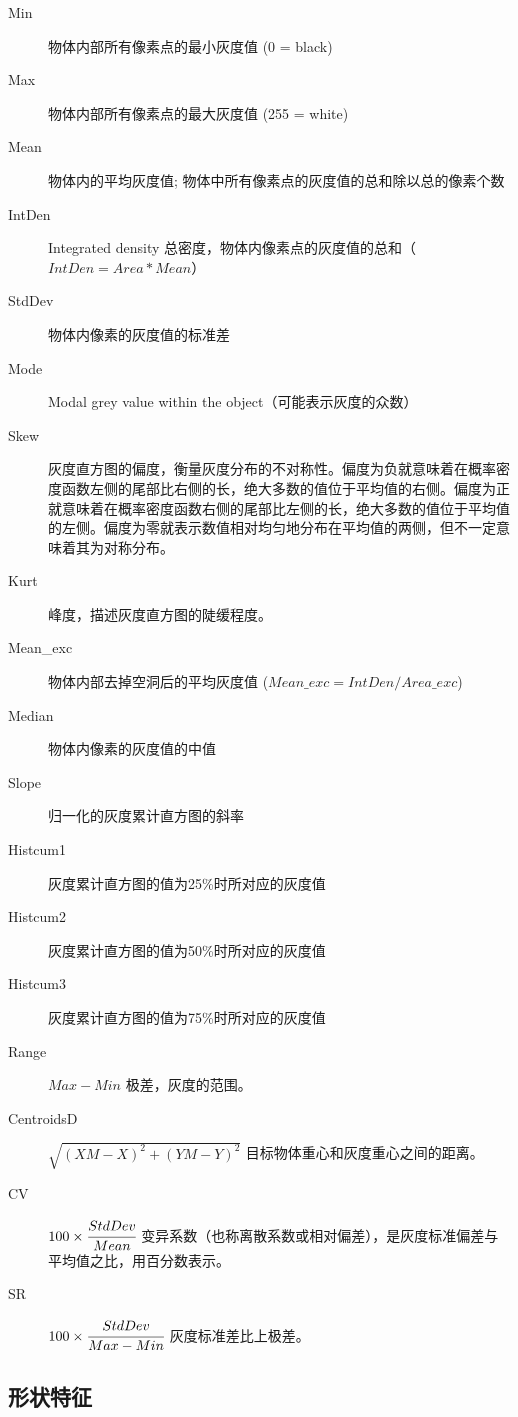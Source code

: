 \begin{description}
    \item[Min] 物体内部所有像素点的最小灰度值 (0 = black)
    \item[Max] 物体内部所有像素点的最大灰度值 (255 = white)
    \item[Mean] 物体内的平均灰度值; 物体中所有像素点的灰度值的总和除以总的像素个数
    \item[IntDen] Integrated density 总密度，物体内像素点的灰度值的总和（$IntDen = Area * Mean$）
    \item[StdDev] 物体内像素的灰度值的标准差
    \item[Mode] Modal grey value within the object（可能表示灰度的众数）
    \item[Skew] 灰度直方图的偏度，衡量灰度分布的不对称性。偏度为负就意味着在概率密度函数左侧的尾部比右侧的长，绝大多数的值位于平均值的右侧。偏度为正就意味着在概率密度函数右侧的尾部比左侧的长，绝大多数的值位于平均值的左侧。偏度为零就表示数值相对均匀地分布在平均值的两侧，但不一定意味着其为对称分布。
    \item[Kurt] 峰度，描述灰度直方图的陡缓程度。 
    \item[Mean\_exc] 物体内部去掉空洞后的平均灰度值 ($Mean\_exc = IntDen / Area\_exc$)
    \item[Median] 物体内像素的灰度值的中值
    \item[Slope] 归一化的灰度累计直方图的斜率
    \item[Histcum1] 灰度累计直方图的值为25\%时所对应的灰度值
    \item[Histcum2] 灰度累计直方图的值为50\%时所对应的灰度值
    \item[Histcum3] 灰度累计直方图的值为75\%时所对应的灰度值
    \item[Range] $Max-Min$ 极差，灰度的范围。
    \item[CentroidsD] $\sqrt{(XM-X)^{2}+(YM-Y)^{2}}$ 目标物体重心和灰度重心之间的距离。
    \item[CV] $100 \times \cfrac{StdDev}{Mean}$ 变异系数（也称离散系数或相对偏差），是灰度标准偏差与平均值之比，用百分数表示。
    \item[SR] $100 \times \cfrac{StdDev}{Max-Min}$ 灰度标准差比上极差。
\end{description}

\subsection{形状特征}

